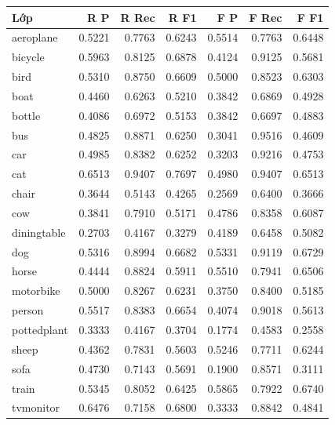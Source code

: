 \begin{tabular}{lrrrrrr}
\toprule
Lớp & R P & R Rec & R F1 & F P & F Rec & F F1\\
\midrule
aeroplane & 0.5221 & 0.7763 & 0.6243 & 0.5514 & 0.7763 & 0.6448\\
bicycle & 0.5963 & 0.8125 & 0.6878 & 0.4124 & 0.9125 & 0.5681\\
bird & 0.5310 & 0.8750 & 0.6609 & 0.5000 & 0.8523 & 0.6303\\
boat & 0.4460 & 0.6263 & 0.5210 & 0.3842 & 0.6869 & 0.4928\\
bottle & 0.4086 & 0.6972 & 0.5153 & 0.3842 & 0.6697 & 0.4883\\
bus & 0.4825 & 0.8871 & 0.6250 & 0.3041 & 0.9516 & 0.4609\\
car & 0.4985 & 0.8382 & 0.6252 & 0.3203 & 0.9216 & 0.4753\\
cat & 0.6513 & 0.9407 & 0.7697 & 0.4980 & 0.9407 & 0.6513\\
chair & 0.3644 & 0.5143 & 0.4265 & 0.2569 & 0.6400 & 0.3666\\
cow & 0.3841 & 0.7910 & 0.5171 & 0.4786 & 0.8358 & 0.6087\\
diningtable & 0.2703 & 0.4167 & 0.3279 & 0.4189 & 0.6458 & 0.5082\\
dog & 0.5316 & 0.8994 & 0.6682 & 0.5331 & 0.9119 & 0.6729\\
horse & 0.4444 & 0.8824 & 0.5911 & 0.5510 & 0.7941 & 0.6506\\
motorbike & 0.5000 & 0.8267 & 0.6231 & 0.3750 & 0.8400 & 0.5185\\
person & 0.5517 & 0.8383 & 0.6654 & 0.4074 & 0.9018 & 0.5613\\
pottedplant & 0.3333 & 0.4167 & 0.3704 & 0.1774 & 0.4583 & 0.2558\\
sheep & 0.4362 & 0.7831 & 0.5603 & 0.5246 & 0.7711 & 0.6244\\
sofa & 0.4730 & 0.7143 & 0.5691 & 0.1900 & 0.8571 & 0.3111\\
train & 0.5345 & 0.8052 & 0.6425 & 0.5865 & 0.7922 & 0.6740\\
tvmonitor & 0.6476 & 0.7158 & 0.6800 & 0.3333 & 0.8842 & 0.4841\\
\bottomrule
\end{tabular}
